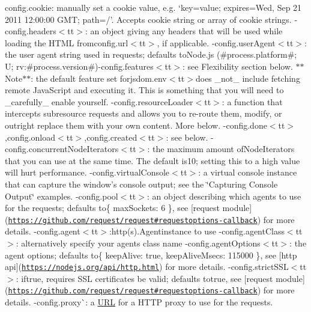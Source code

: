 \begin{DoxyItemize}
\item {\ttfamily config.\+cookie}\+: manually set a cookie value, e.\+g. `\textquotesingle{}key=value; expires=Wed, Sep 21 2011 12\+:00\+:00 G\+MT; path=/'{\ttfamily . Accepts cookie string or array of cookie strings. -\/}config.\+headers$<$tt$>$\+: an object giving any headers that will be used while loading the H\+T\+ML fromconfig.\+url$<$tt$>$, if applicable. -\/config.\+user\+Agent$<$tt$>$\+: the user agent string used in requests; defaults toNode.\+js (\#process.\+platform\#; U; rv\+:\#process.\+version\#){\ttfamily  -\/}config.\+features$<$tt$>$\+: see Flexibility section below. $\ast$$\ast$\+Note$\ast$$\ast$\+: the default feature set forjsdom.\+env$<$tt$>$does \+\_\+not\+\_\+ include fetching remote Java\+Script and executing it. This is something that you will need to \+\_\+carefully\+\_\+ enable yourself. -\/config.\+resource\+Loader$<$tt$>$\+: a function that intercepts subresource requests and allows you to re-\/route them, modify, or outright replace them with your own content. More below. -\/config.\+done$<$tt$>$,config.\+onload$<$tt$>$,config.\+created$<$tt$>$\+: see below. -\/config.\+concurrent\+Node\+Iterators$<$tt$>$\+: the maximum amount ofNode\+Iterator{\ttfamily s that you can use at the same time. The default is}10{\ttfamily ; setting this to a high value will hurt performance. -\/}config.\+virtual\+Console$<$tt$>$\+: a virtual console instance that can capture the window’s console output; see the \char`\"{}\+Capturing Console Output\char`\"{} examples. -\/config.\+pool$<$tt$>$\+: an object describing which agents to use for the requests; defaults to\{ max\+Sockets\+: 6 \}{\ttfamily , see \mbox{[}request module\mbox{]}(\href{https://github.com/request/request#requestoptions-callback}{\tt https\+://github.\+com/request/request\#requestoptions-\/callback}) for more details. -\/}config.\+agent$<$tt$>$\+:http(s).Agent{\ttfamily instance to use -\/}config.\+agent\+Class$<$tt$>$\+: alternatively specify your agent\textquotesingle{}s class name -\/config.\+agent\+Options$<$tt$>$\+: the agent options; defaults to\{ keep\+Alive\+: true, keep\+Alive\+Msecs\+: 115000 \}{\ttfamily , see \mbox{[}http api\mbox{]}(\href{https://nodejs.org/api/http.html}{\tt https\+://nodejs.\+org/api/http.\+html}) for more details. -\/}config.\+strict\+S\+S\+L$<$tt$>$\+: iftrue{\ttfamily , requires S\+SL certificates be valid; defaults to}true{\ttfamily , see \mbox{[}request module\mbox{]}(\href{https://github.com/request/request#requestoptions-callback}{\tt https\+://github.\+com/request/request\#requestoptions-\/callback}) for more details. -\/}config.\+proxy\`{}\+: a \mbox{\hyperlink{namespace_u_r_l}{U\+RL}} for a H\+T\+TP proxy to use for the requests.
\end{DoxyItemize}

